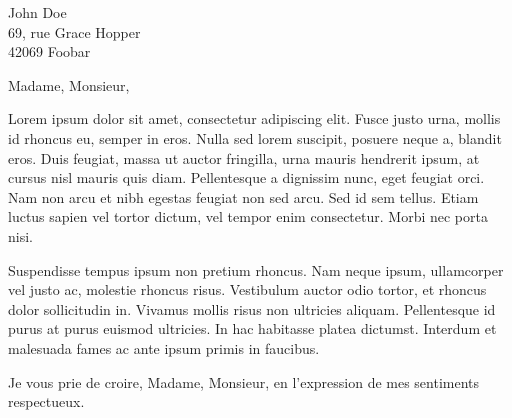 \documentclass[12pt]{lettre}
\newcommand{\senderName}{Derp Derpson}
\begin{document}
\begin{letter}{John Doe \\ 69, rue Grace Hopper \\ 42069 Foobar} %
  \name{\senderName}
  \address{\senderName \\ 42, rue Ada Lovelace \\ 42069 Turing City}
  \nofax


  \def\concname{Objet :~}

  \opening{Madame, Monsieur,}

  Lorem ipsum dolor sit amet, consectetur adipiscing elit. Fusce justo urna, mollis id rhoncus eu, semper in eros. Nulla sed lorem suscipit, posuere neque a, blandit eros. Duis feugiat, massa ut auctor fringilla, urna mauris hendrerit ipsum, at cursus nisl mauris quis diam. Pellentesque a dignissim nunc, eget feugiat orci. Nam non arcu et nibh egestas feugiat non sed arcu. Sed id sem tellus. Etiam luctus sapien vel tortor dictum, vel tempor enim consectetur. Morbi nec porta nisi.

  Suspendisse tempus ipsum non pretium rhoncus. Nam neque ipsum, ullamcorper vel justo ac, molestie rhoncus risus. Vestibulum auctor odio tortor, et rhoncus dolor sollicitudin in. Vivamus mollis risus non ultricies aliquam. Pellentesque id purus at purus euismod ultricies. In hac habitasse platea dictumst. Interdum et malesuada fames ac ante ipsum primis in faucibus.

  \closing{Je vous prie de croire, Madame, Monsieur, en l’expression de mes sentiments respectueux.}
  \signature{\senderName}
\end{letter}
\end{document}
